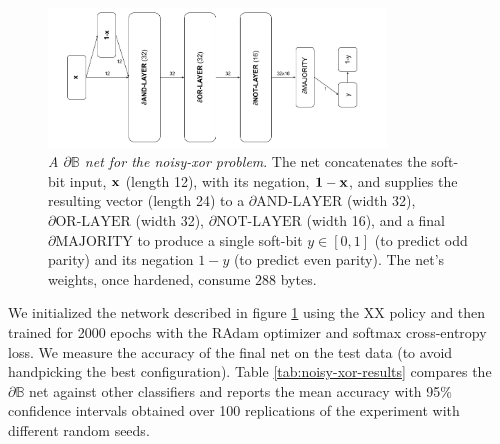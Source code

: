 \documentclass{article} %
\begin{document}
\begin{figure}[t]
	\centering
	\includegraphics[width=0.8\textwidth]{noisy-xor-architecture.png}
	\caption{{\em A $\partial\mathbb{B}$ net for the noisy-xor problem}. The net concatenates the soft-bit input, ${\bf x}$ (length 12), with its negation, ${\bf 1 - x}$, and supplies the resulting vector (length 24) to a $\partial\text{AND-LAYER}$ (width 32), $\partial\text{OR-LAYER}$ (width 32),  $\partial\text{NOT-LAYER}$ (width 16), and a final $\partial\text{MAJORITY}$ to produce a single soft-bit $y \in [0,1]$ (to predict odd parity) and its negation $1-y$ (to predict even parity). The net's weights, once hardened, consume $288$ bytes.}
	\label{fig:noisy-xor-architecture}
\end{figure}

We initialized the network described in figure \ref{fig:noisy-xor-architecture} using the XX policy and then trained for 2000 epochs with the RAdam optimizer \citep{Liu2020On} and softmax cross-entropy loss. We measure the accuracy of the final net on the test data (to avoid handpicking the best configuration). Table \ref{tab:noisy-xor-results} compares the $\partial\mathbb{B}$ net against other classifiers \citep{granmo18} and reports the mean accuracy with 95\% confidence intervals obtained over 100 replications of the experiment with different random seeds. 
\end{document}
